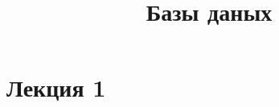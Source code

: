\documentclass[11pt]{article}
\title{\textbf{Базы даных}}
\date{}
\begin{document}
\maketitle

\section{Лекция 1}
\end{document}
